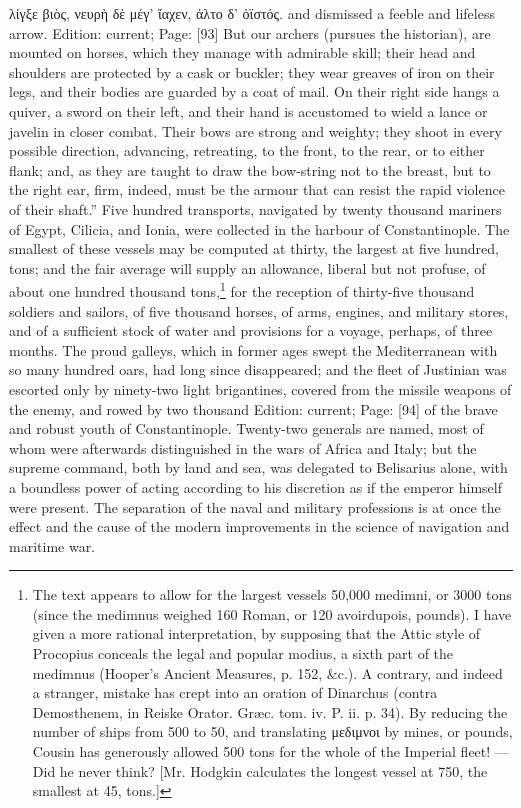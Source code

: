 {\textgreek{λίγξε βι\texthebrew{ὸ}ς, νευρ\texthebrew{ὴ} δ\texthebrew{ὲ} μέγ\texthebrew{’ ἴ}αχεν, \texthebrew{ἀ}λτο δ\texthebrew{’ ὀ}ϊστός}.} and dismissed a feeble and lifeless arrow. Edition: current; Page: [93] But our archers (pursues the historian), are mounted on horses, which they manage with admirable skill; their head and shoulders are protected by a cask or buckler; they wear greaves of iron on their legs, and their bodies are guarded by a coat of mail. On their right side hangs a quiver, a sword on their left, and their hand is accustomed to wield a lance or javelin in closer combat. Their bows are strong and weighty; they shoot in every possible direction, advancing, retreating, to the front, to the rear, or to either flank; and, as they are taught to draw the bow-string not to the breast, but to the right ear, firm, indeed, must be the armour that can resist the rapid violence of their shaft.\texthebrew{}” Five hundred transports, navigated by twenty thousand mariners of Egypt, Cilicia, and Ionia, were collected in the harbour of Constantinople. The smallest of these vessels may be computed at thirty, the largest at five hundred, tons; and the fair average will supply an allowance, liberal but not profuse, of about one hundred thousand tons,\footnote{The text appears to allow for the largest vessels 50,000 medimni, or 3000 tons (since the medimnus weighed 160 Roman, or 120 avoirdupois, pounds). I have given a more rational interpretation, by supposing that the Attic style of Procopius conceals the legal and popular modius, a sixth part of the medimnus (Hooper\texthebrew{}’s Ancient Measures, p. 152, \&c.). A contrary, and indeed a stranger, mistake has crept into an oration of Dinarchus (contra Demosthenem, in Reiske Orator. Græc. tom. iv. P. ii. p. 34). By reducing the number of ships from 500 to 50, and translating \textgreek{μεδιμνοι} by mines, or pounds, Cousin has generously allowed 500 tons for the whole of the Imperial fleet! \texthebrew{—} Did he never think? [Mr. Hodgkin calculates the longest vessel at 750, the smallest at 45, tons.]} for the reception of thirty-five thousand soldiers and sailors, of five thousand horses, of arms, engines, and military stores, and of a sufficient stock of water and provisions for a voyage, perhaps, of three months. The proud galleys, which in former ages swept the Mediterranean with so many hundred oars, had long since disappeared; and the fleet of Justinian was escorted only by ninety-two light brigantines, covered from the missile weapons of the enemy, and rowed by two thousand Edition: current; Page: [94] of the brave and robust youth of Constantinople. Twenty-two generals are named, most of whom were afterwards distinguished in the wars of Africa and Italy; but the supreme command, both by land and sea, was delegated to Belisarius alone, with a boundless power of acting according to his discretion as if the emperor himself were present. The separation of the naval and military professions is at once the effect and the cause of the modern improvements in the science of navigation and maritime war.

